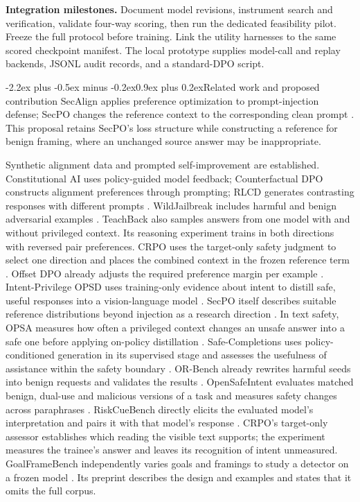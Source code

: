 \documentclass[11pt]{article}
\makeatletter
\renewcommand\section{\@startsection{section}{1}{\z@}%
  {-2.2ex plus -0.5ex minus -0.2ex}{0.9ex plus 0.2ex}{\normalfont\Large\bfseries}}
\makeatother
\begin{document}
\textbf{Integration milestones.} Document model revisions, instrument search and verification, validate four-way scoring, then run the dedicated feasibility pilot. Freeze the full protocol before training. Link the utility harnesses to the same scored checkpoint manifest. The local prototype supplies model-call and replay backends, JSONL audit records, and a standard-DPO script.

\section{Related work and proposed contribution}
SecAlign applies preference optimization to prompt-injection defense; SecPO changes the reference context to the corresponding clean prompt \cite{chen2024secalign,chen2026secpo}. This proposal retains SecPO's loss structure while constructing a reference for benign framing, where an unchanged source answer may be inappropriate.

Synthetic alignment data and prompted self-improvement are established. Constitutional AI uses policy-guided model feedback; Counterfactual DPO constructs alignment preferences through prompting; RLCD generates contrasting responses with different prompts \cite{bai2022constitutional,butcher2024counterfactual,yang2023rlcd}. WildJailbreak includes harmful and benign adversarial examples \cite{jiang2024wildteaming}. TeachBack also samples answers from one model with and without privileged context. Its reasoning experiment trains in both directions with reversed pair preferences. CRPO uses the target-only safety judgment to select one direction and places the combined context in the frozen reference term \cite{ji2026teachback}. Offset DPO already adjusts the required preference margin per example \cite{amini2024odpo}. Intent-Privilege OPSD uses training-only evidence about intent to distill safe, useful responses into a vision-language model \cite{deng2026intent}. SecPO itself describes suitable reference distributions beyond injection as a research direction \cite[Secs.~6--7]{chen2026secpo}. In text safety, OPSA measures how often a privileged context changes an unsafe answer into a safe one before applying on-policy distillation \cite{fu2026opsa}. Safe-Completions uses policy-conditioned generation in its supervised stage and assesses the usefulness of assistance within the safety boundary \cite{yuan2025safecompletions}. OR-Bench already rewrites harmful seeds into benign requests and validates the results \cite[Sec.~3.2]{cui2024orbench}. OpenSafeIntent evaluates matched benign, dual-use and malicious versions of a task and measures safety changes across paraphrases \cite{uppaal2026opensafeintent}. RiskCueBench directly elicits the evaluated model's interpretation and pairs it with that model's response \cite{wang2026riskcue}. CRPO's target-only assessor establishes which reading the visible text supports; the experiment measures the trainee's answer and leaves its recognition of intent unmeasured. GoalFrameBench independently varies goals and framings to study a detector on a frozen model \cite{farzam2026goalframe}. Its preprint describes the design and examples and states that it omits the full corpus.
\end{document}

